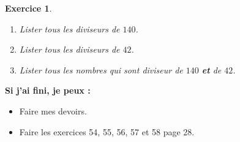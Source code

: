 \documentclass[a4paper]{article}
\theoremstyle{exostyle}
\newtheorem{exercice}{Exercice}
\begin{document}
\begin{exercice}
	\begin{enumerate}
		\item Lister tous les diviseurs de $140$.
		\item Lister tous les diviseurs de $42$.
		\item Lister tous les nombres qui sont diviseur de $140$ \textbf{et} de $42$.
	\end{enumerate}
\end{exercice}

\textbf{Si j'ai fini, je peux : \\}

\begin{itemize}
	\item Faire mes devoirs.
	\item Faire les exercices 54, 55, 56, 57 et 58 page 28.
\end{itemize}
\end{document}
